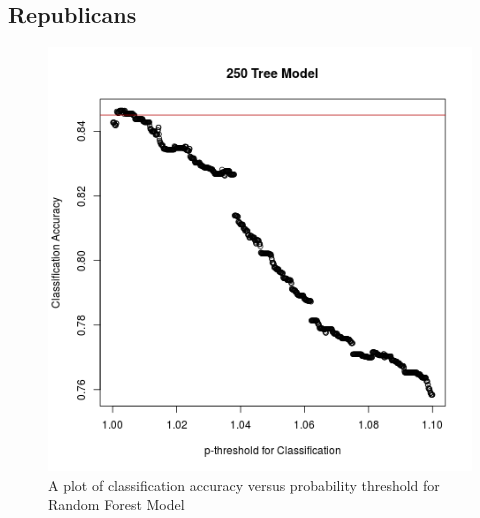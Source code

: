 \documentclass[xcolor=dvipsnames]{beamer}
\begin{document}
\begin{frame}
\subsection{Republicans}
\begin{figure}[h!]
\includegraphics[scale = 0.2]{RFmodelaccuracy250.png}
\caption{A plot of classification accuracy versus probability threshold for Random Forest Model}
\end{figure}
\begin{table}
\centering
{}
\caption{Random Forest with 250 Trees Confusion Matrix.  Has an accuracy of 84.64\%}

\end{table}
\end{frame}
\end{document}
